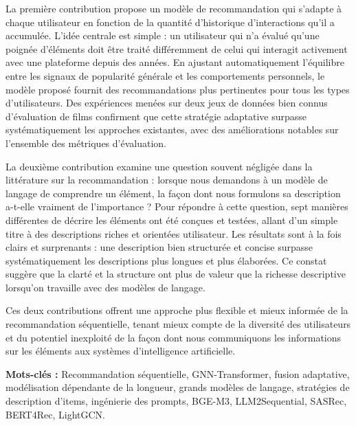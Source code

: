\documentclass[12pt,a4paper]{report}
\begin{document}
La première contribution propose un modèle de recommandation qui s'adapte à chaque
utilisateur en fonction de la quantité d'historique d'interactions qu'il a accumulée. L'idée
centrale est simple : un utilisateur qui n'a évalué qu'une poignée d'éléments doit être traité
différemment de celui qui interagit activement avec une plateforme depuis des années. En
ajustant automatiquement l'équilibre entre les signaux de popularité générale et les
comportements personnels, le modèle proposé fournit des recommandations plus pertinentes
pour tous les types d'utilisateurs. Des expériences menées sur deux jeux de données bien
connus d'évaluation de films confirment que cette stratégie adaptative surpasse
systématiquement les approches existantes, avec des améliorations notables sur l'ensemble
des métriques d'évaluation.

La deuxième contribution examine une question souvent négligée dans la littérature sur la
recommandation : lorsque nous demandons à un modèle de langage de comprendre un
élément, la façon dont nous formulons sa description a-t-elle vraiment de l'importance ? Pour
répondre à cette question, sept manières différentes de décrire les éléments ont été conçues et
testées, allant d'un simple titre à des descriptions riches et orientées utilisateur. Les résultats
sont à la fois clairs et surprenants : une description bien structurée et concise surpasse
systématiquement les descriptions plus longues et plus élaborées. Ce constat suggère que la
clarté et la structure ont plus de valeur que la richesse descriptive lorsqu'on travaille avec
des modèles de langage.

Ces deux contributions offrent une approche plus flexible et mieux informée de la
recommandation séquentielle, tenant mieux compte de la diversité des utilisateurs et du
potentiel inexploité de la façon dont nous communiquons les informations sur les éléments
aux systèmes d'intelligence artificielle.

\vspace{0.5cm}
\textbf{Mots-clés :} Recommandation séquentielle, GNN-Transformer, fusion adaptative, modélisation dépendante de la longueur, grands modèles de langage, stratégies de description d'items, ingénierie des prompts, BGE-M3, LLM2Sequential, SASRec, BERT4Rec, LightGCN.

\newpage
\renewcommand{\contentsname}{Table of Contents}
\tableofcontents
\newpage
\listoffigures
\newpage
\listoftables
\end{document}
